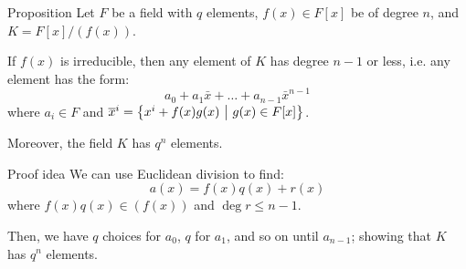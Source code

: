\documentclass[a4paper]{article}
\begin{document}
\begin{parag}{Proposition}
    Let $F$ be a field with $q$ elements, $f\left(x\right) \in F\left[x\right]$ be of degree $n$, and $K = F\left[x\right] / \left(f\left(x\right)\right)$.

    If $f\left(x\right)$ is irreducible, then any element of $K$ has degree $n-1$ or less, i.e. any element has the form: 
    \[a_0 + a_1 \bar{x} + \ldots + a_{n-1} \bar{x}^{n-1}\]
    where $a_i \in F$ and $\bar{x}^i = \left\{x^i + f\left(x\right)g\left(x\right) \suchthat g\left(x\right) \in F\left[x\right]\right\}$.

    Moreover, the field $K$ has $q^n$ elements.

    \begin{subparag}{Proof idea}
        We can use Euclidean division to find: 
        \[a\left(x\right) = f\left(x\right)q\left(x\right) + r\left(x\right)\]
        where $f\left(x\right)q\left(x\right) \in \left(f\left(x\right)\right)$ and $\deg r \leq n-1$.

        Then, we have $q$ choices for $a_0$, $q$ for $a_1$, and so on until $a_{n-1}$; showing that $K$ has $q^n$ elements.
    \end{subparag}
\end{parag}
\end{document}
